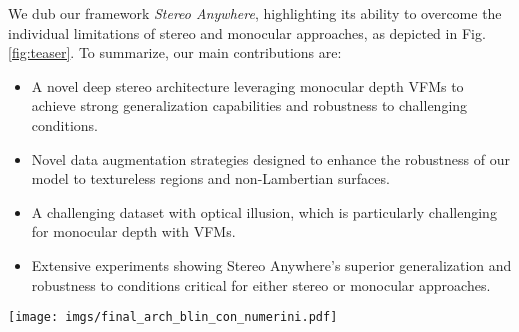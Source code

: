\documentclass[10pt,twocolumn,letterpaper]{article}
\newcommand{\method}[0]{Stereo Anywhere\xspace}
\begin{document}
We dub our framework \textit{\method}, highlighting its ability to overcome the individual limitations of stereo and monocular approaches, as depicted in Fig. \ref{fig:teaser}. To summarize, our main contributions are:

\begin{itemize}
    \item A novel deep stereo architecture leveraging monocular depth VFMs to achieve strong generalization capabilities and robustness to challenging conditions.
    \item Novel data augmentation strategies designed to enhance the robustness of our model to textureless regions and non-Lambertian surfaces.
    \item A challenging dataset with optical illusion, which is particularly challenging for monocular depth with VFMs.
    \item Extensive experiments showing \method's superior generalization and robustness to conditions critical for either stereo or monocular approaches.
\end{itemize}

\begin{figure*}[t]
    \centering
    \texttt{[image: imgs/final\_arch\_blin\_con\_numerini.pdf]}
    \caption{\textbf{\method Architecture.} Given a stereo pair, \textcolor{red}{\bf(1)} a pre-trained backbone is used to extract features and then build a correlation volume. Such a volume is then truncated \textcolor{red}{\bf(2)} to reject matching costs computed for disparity hypotheses being \textit{behind} non-Lambertian surfaces -- glasses and mirrors. On a parallel branch, the two images are processed by a monocular VFM to obtain two depth maps \textcolor{red}{\bf(3)}: these are used to build a second correlation volume from retrieved normals \textcolor{red}{\bf(4)}. This volume is then aggregated through a 3D CNN to predict a new disparity map, used to align the original monocular depth to metric scale through a differentiable scaling module \textcolor{red}{\bf(5)} for it. In parallel, the monocular depth map from left images is processed by another backbone \textcolor{red}{\bf(6)} to extract context features.
    Finally, the two volumes and the context features from monocular depth guide the iterative disparity prediction \textcolor{red}{\bf(7)}.}
    \label{fig:arch}

\end{figure*}
\end{document}
